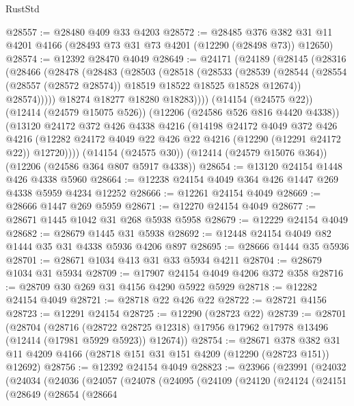 \begin{lexlean}{RustStd}
\begin{coremodule}
{\begin{coremodule}
{{{{{{{{{{{{{{{{{{{{{{{{{{{{{{{{{{{{{{{{{{{{{{{{{{@28557 := @28480 @409 @33 @4203
@28572 := @28485
    @376
    @382
    @31
    @11
    @4201
    @4166
    (@28493 @73 @31 @73 @4201 (@12290 (@28498 @73)) @12650)
@28574 := @12392 @28470 @4049
@28649 := @24171
    (@24189
      (@28145
        (@28316
          (@28466
            (@28478
              (@28483
                (@28503
                  (@28518
                    (@28533
                      (@28539
                        (@28544
                          (@28554 (@28557 (@28572 @28574)) @18519 @18522 @18525 @18528 @12674))
                        @28574)))))
              @18274
              @18277
              @18280
              @18283))))
      (@14154 (@24575 @22))
      (@12414 (@24579 @15075 @526))
      (@12206 (@24586 @526 @816 @4420 @4338))
      (@13120
        @24172
        @372
        @426
        @4338
        @4216
        (@14198
          @24172
          @4049
          @372
          @426
          @4216
          (@12282 @24172 @4049 @22 @426 @22 @4216 (@12290 (@12291 @24172 @22)) @12720))))
    (@14154 (@24575 @30))
    (@12414 (@24579 @15076 @364))
    (@12206 (@24586 @364 @807 @5917 @4338))
@28654 := @13120 @24154 @1448 @426 @4338 @5960
@28664 := @12238 @24154 @4049 @364 @426 @1447 @269 @4338 @5959 @4234 @12252
@28666 := @12261 @24154 @4049
@28669 := @28666 @1447 @269 @5959
@28671 := @12270 @24154 @4049
@28677 := @28671 @1445 @1042 @31 @268 @5938 @5958
@28679 := @12229 @24154 @4049
@28682 := @28679 @1445 @31 @5938
@28692 := @12448 @24154 @4049 @82 @1444 @35 @31 @4338 @5936 @4206 @897
@28695 := @28666 @1444 @35 @5936
@28701 := @28671 @1034 @413 @31 @33 @5934 @4211
@28704 := @28679 @1034 @31 @5934
@28709 := @17907 @24154 @4049 @4206 @372 @358
@28716 := @28709 @30 @269 @31 @4156 @4290 @5922 @5929
@28718 := @12282 @24154 @4049
@28721 := @28718 @22 @426 @22
@28722 := @28721 @4156
@28723 := @12291 @24154
@28725 := @12290 (@28723 @22)
@28739 := @28701
    (@28704
      (@28716
        (@28722 @28725 @12318)
        @17956
        @17962
        @17978
        @13496
        (@12414 (@17981 @5929 @5923))
        @12674))
@28754 := @28671
    @378
    @382
    @31
    @11
    @4209
    @4166
    (@28718 @151 @31 @151 @4209 (@12290 (@28723 @151)) @12692)
@28756 := @12392 @24154 @4049
@28823 := @23966
    (@23991
      (@24032
        (@24034
          (@24036
            (@24057
              (@24078
                (@24095
                  (@24109
                    (@24120
                      (@24124
                        (@24151
                          (@28649
                            (@28654
                              (@28664
}}}}}}}}}}}}}}}}}}}}}}}}}}}}}}}}}}}}}}}}}}}}}}}}}}
\end{coremodule}}
\end{coremodule}
\end{lexlean}
